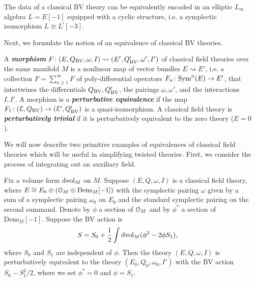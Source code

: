 \documentclass[10pt, oneside]{article}
\newcommand{\Dens}{\mathrm{Dens}}
\newcommand{\defterm}[1]{\textbf{\emph{#1}}}
\begin{document}
\begin{remark}
The data of a classical BV theory can be equivalently encoded in an elliptic $L_\infty$ algebra $L=E[-1]$ equipped with a cyclic structure, i.e. a symplectic isomorphism $L\cong L^![-3]$.
\end{remark}

Next, we formulate the notion of an equivalence of classical BV theories. 

\begin{definition}
A \defterm{morphism} $F\colon (E, Q_{\mathrm{BV}}, \omega, I) \rightsquigarrow (E', Q_{\mathrm{BV}}', \omega', I')$ of classical field theories over the same manifold $M$ is a nonlinear map of vector bundles $E\rightsquigarrow E'$, i.e. a collection $F=\sum_{n\geq 1}^\infty F$ of poly-differential operators $F_n\colon {\rm Sym}^n(E)\rightarrow E'$, that intertwines the differentials $Q_{\mathrm{BV}}, Q_{\mathrm{BV}}'$, the pairings $\omega, \omega'$, and the interactions $I,I'$. A morphism is a \defterm{perturbative equivalence} if the map $F_1\colon (\mathcal E, Q_{\mathrm{BV}})\rightarrow (\mathcal E', Q_{\mathrm{BV}}')$ is a quasi-isomorphism. A classical field theory is \defterm{perturbatively trivial} if it is perturbatively equivalent to the zero theory ($E = 0$).
\end{definition}

We will now describe two primitive examples of equivalences of classical field theories which will be useful in simplifying twisted theories. First, we consider the process of integrating out an auxiliary field.

 

\begin{prop}
Fix a volume form $\operatorname{dvol}_M$ on $M$. Suppose $(E, Q, \omega, I)$ is a classical field theory, where $E\cong E_0\oplus (\cO_M\oplus \Dens_M[-1])$ with the symplectic pairing $\omega$ given by a sum of a symplectic pairing $\omega_0$ on $E_0$ and the standard symplectic pairing on the second summand. Denote by $\phi$ a section of $\mathcal O_M$ and by $\phi^*$ a section of $\Dens_M[-1]$. Suppose the BV action is
\[S = S_0 + \frac{1}{2} \int \operatorname{dvol}_M (\phi^2 - 2\phi S_1),\]
where $S_0$ and $S_1$ are independent of $\phi$. Then the theory $(E, Q, \omega, I)$ is perturbatively equivalent to the theory $(E_0, Q_0, \omega_0, I')$ with the BV action $S_0 - S_1^2/2$, where we set $\phi^* = 0$ and $\phi = S_1$.
\label{prop:integrateoutfield}
\end{prop}
\end{document}
